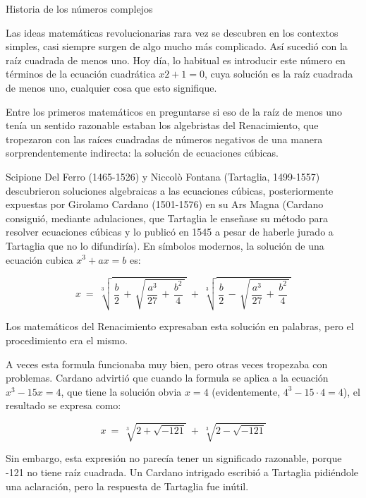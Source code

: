 \vspace{5mm}
\begin{myexampleblock}{Historia de los números complejos}
\begin{small}
Las ideas matemáticas revolucionarias rara vez se descubren en los contextos simples, casi siempre surgen de algo mucho más complicado. Así sucedió con la raíz cuadrada de menos uno. Hoy día, lo habitual es introducir este número en términos de la ecuación cuadrática $x2 + 1 =0$, cuya solución es la raíz cuadrada de menos uno, cualquier cosa que esto signifique.

\vspace{1mm} Entre los primeros matemáticos en preguntarse si eso de la raíz de menos uno tenía un sentido razonable estaban los algebristas del Renacimiento, que tropezaron con las raíces cuadradas de números negativos de una manera sorprendentemente indirecta: la solución de ecuaciones cúbicas.

\vspace{1mm} Scipione Del Ferro (1465-1526) y Niccolò Fontana (Tartaglia, 1499-1557) descubrieron soluciones algebraicas a las ecuaciones cúbicas, posteriormente expuestas por Girolamo Cardano (1501-1576) en su Ars Magna (Cardano consiguió, mediante adulaciones, que Tartaglia le enseñase su método para resolver ecuaciones cúbicas y lo publicó en 1545 a pesar de haberle jurado a Tartaglia que no lo difundiría). En símbolos modernos, la solución de una ecuación cubica $x^3 + ax = b$ es:

$$x \ = \ \sqrt[3]{ \, \dfrac b 2 \, + \, \sqrt{ \, \dfrac{a^3}{27} \, + \, \dfrac{b^2}{4} \, } \, }  \ + \ 
\sqrt[3]{ \, \dfrac b 2 \, - \, \sqrt{ \, \dfrac{a^3}{27} \, + \, \dfrac{b^2}{4} \, } \, } $$

Los matemáticos del Renacimiento expresaban esta solución en palabras, pero el procedimiento era el mismo.

\vspace{1mm} A veces esta formula funcionaba muy bien, pero otras veces tropezaba con problemas. Cardano advirtió que cuando la formula se aplica a la ecuación $x^3 -15x = 4$, que tiene la solución obvia $x = 4$ (evidentemente, $4^3-15\cdot 4=4$), el resultado se expresa como:

$$x\ = \ \sqrt[3]{2+\sqrt{-121}} \ + \ \sqrt[3]{2-\sqrt{-121}}$$

Sin embargo, esta expresión no parecía tener un significado razonable, porque -121 no tiene raíz cuadrada. Un Cardano intrigado escribió a Tartaglia pidiéndole una aclaración, pero la  respuesta  de Tartaglia fue inútil.


\end{small}
\end{myexampleblock}
